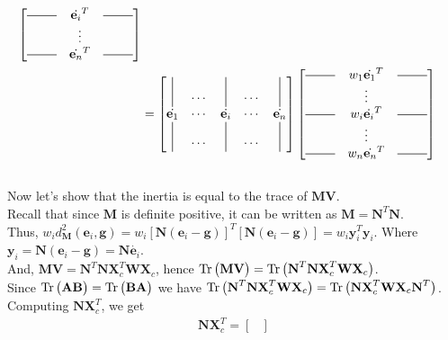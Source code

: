 \begin{notechapter}
\begin{align*}
\begin{bmatrix*}
    \horzbar &{\dot{\textbf{e}_{i}}}^T & \horzbar\\
    &\vdots&\\
    \horzbar &{\dot{\textbf{e}_{n}}}^T & \horzbar
\end{bmatrix*}\\
&=
\begin{bmatrix*}
    \vertbar & \cdots & \vertbar & \cdots & \vertbar\\
    \dot{\textbf{e}_{1}} & \cdots & \dot{\textbf{e}_{i}} & \cdots & \dot{\textbf{e}_{n}}\\
    \vertbar & \cdots & \vertbar & \cdots & \vertbar
\end{bmatrix*}
\begin{bmatrix*}
    \horzbar & w_1 \dot{\textbf{e}_{1}}^T & \horzbar\\
    &\vdots&\\
    \horzbar & w_i \dot{\textbf{e}_{i}}^T & \horzbar\\
    &\vdots&\\
    \horzbar & w_n \dot{\textbf{e}_{n}}^T & \horzbar
\end{bmatrix*}
\end{align*}
\\[8px]
%
Now let's show that the inertia is equal to the trace of $\textbf{M}\textbf{V}$.\\[6pt]
%
Recall that since $\textbf{M}$ is definite positive, it can be written as $\textbf{M}=\textbf{N}^T \textbf{N}$.\\[10pt]
%
Thus, $w_{i} d_{\textbf{M}}^2(\textbf{e}_i,\textbf{g}) = 
w_{i} [\textbf{N}(\textbf{e}_i - \textbf{g})]^T [\textbf{N} (\textbf{e}_i - \textbf{g})] = w_i \textbf{y}_i^T \textbf{y}_i$. 
Where $\textbf{y}_i = \textbf{N}(\textbf{e}_i - \textbf{g}) = \textbf{N} \dot{\textbf{e}_i}$.\\[10pt]
%
%
And, $\textbf{M} \textbf{V} = \textbf{N}^T \textbf{N} \textbf{X}_c^T \textbf{W} \textbf{X}_c$, hence 
$\operatorname{Tr} \big(\textbf{M} \textbf{V} \big) = \operatorname{Tr} \big(\textbf{N}^T \textbf{N} \textbf{X}_c^T \textbf{W} \textbf{X}_c \big)$.\\[10pt]
%
Since $\operatorname{Tr} \big(\textbf{A} \textbf{B} \big) = \operatorname{Tr} \big(\textbf{B} \textbf{A} \big)$ we have 
$\operatorname{Tr} \big(\textbf{N}^T \textbf{N} \textbf{X}_c^T \textbf{W} \textbf{X}_c \big) = 
\operatorname{Tr} \big(\textbf{N} \textbf{X}_c^T \textbf{W} \textbf{X}_c \textbf{N}^T \big)$.\\[8pt]
%
Computing $\textbf{N}\textbf{X}_c^T$, we get
%
\begin{align*}
    \textbf{N}\textbf{X}_c^T =
    \begin{bmatrix*}

\end{bmatrix*}
\end{align*}
\end{notechapter}
